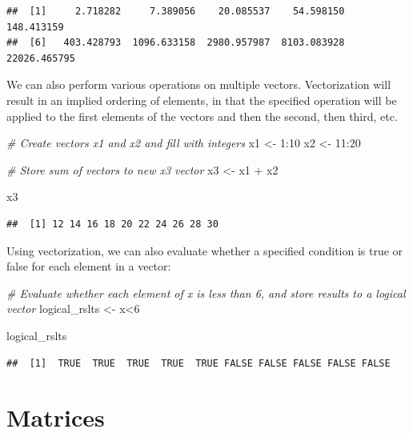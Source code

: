 \documentclass[
]{book}
\newenvironment{Shaded}{\begin{snugshade}}{\end{snugshade}}
\newcommand{\CommentTok}[1]{\textcolor[rgb]{0.56,0.35,0.01}{\textit{#1}}}
\newcommand{\DecValTok}[1]{\textcolor[rgb]{0.00,0.00,0.81}{#1}}
\newcommand{\NormalTok}[1]{#1}
\newcommand{\OtherTok}[1]{\textcolor[rgb]{0.56,0.35,0.01}{#1}}
\newcommand{\SpecialCharTok}[1]{\textcolor[rgb]{0.00,0.00,0.00}{#1}}
\begin{document}
\begin{verbatim}
##  [1]     2.718282     7.389056    20.085537    54.598150   148.413159
##  [6]   403.428793  1096.633158  2980.957987  8103.083928 22026.465795
\end{verbatim}

We can also perform various operations on multiple vectors. Vectorization will result in an implied ordering of elements, in that the specified operation will be applied to the first elements of the vectors and then the second, then third, etc.

\begin{Shaded}
\begin{Highlighting}[]
\CommentTok{\# Create vectors x1 and x2 and fill with integers}
\NormalTok{x1 }\OtherTok{\textless{}{-}} \DecValTok{1}\SpecialCharTok{:}\DecValTok{10}
\NormalTok{x2 }\OtherTok{\textless{}{-}} \DecValTok{11}\SpecialCharTok{:}\DecValTok{20}

\CommentTok{\# Store sum of vectors to new x3 vector}
\NormalTok{x3 }\OtherTok{\textless{}{-}}\NormalTok{ x1 }\SpecialCharTok{+}\NormalTok{ x2}

\NormalTok{x3}
\end{Highlighting}
\end{Shaded}

\begin{verbatim}
##  [1] 12 14 16 18 20 22 24 26 28 30
\end{verbatim}

Using vectorization, we can also evaluate whether a specified condition is true or false for each element in a vector:

\begin{Shaded}
\begin{Highlighting}[]
\CommentTok{\# Evaluate whether each element of x is less than 6, and store results to a logical vector}
\NormalTok{logical\_rslts }\OtherTok{\textless{}{-}}\NormalTok{ x}\SpecialCharTok{\textless{}}\DecValTok{6}

\NormalTok{logical\_rslts}
\end{Highlighting}
\end{Shaded}

\begin{verbatim}
##  [1]  TRUE  TRUE  TRUE  TRUE  TRUE FALSE FALSE FALSE FALSE FALSE
\end{verbatim}

\hypertarget{matrices}{%
\section{Matrices}\label{matrices}}
\end{document}
